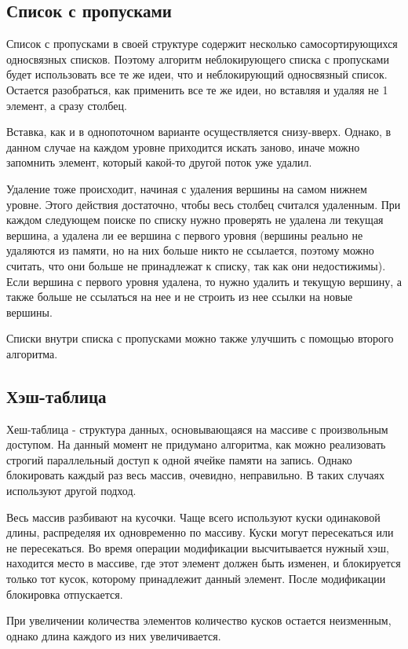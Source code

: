 \documentclass[12pt]{article}
\begin{document}
{			\subsection{Список с пропусками}
				\par Список с пропусками в своей структуре содержит несколько самосортирующихся односвязных списков. Поэтому алгоритм неблокирующего списка с пропусками будет использовать все те же идеи, что и неблокирующий односвязный список. Остается разобраться, как применить все те же идеи, но вставляя и удаляя не 1 элемент, а сразу столбец. 
				\par Вставка, как и в однопоточном варианте осуществляется снизу-вверх. Однако, в данном случае на каждом уровне приходится искать заново, иначе можно запомнить элемент, который какой-то другой поток уже удалил.
				\par Удаление тоже происходит, начиная с удаления вершины на самом нижнем уровне. Этого действия достаточно, чтобы весь столбец считался удаленным. При каждом следующем поиске по списку нужно проверять не удалена ли текущая вершина, а удалена ли ее вершина с первого уровня (вершины реально не удаляются из памяти, но на них больше никто не ссылается, поэтому можно считать, что они больше не принадлежат к списку, так как они недостижимы). Если вершина с первого уровня удалена, то нужно удалить и текущую вершину, а также больше не ссылаться на нее и не строить из нее ссылки на новые вершины.
				\par Списки внутри списка с пропусками можно также улучшить с помощью второго алгоритма.
			\subsection{Хэш-таблица}
				\par Хеш-таблица - структура данных, основывающаяся на массиве с произвольным доступом. На данный момент не придумано алгоритма, как можно реализовать строгий параллельный доступ к одной ячейке памяти на запись. Однако блокировать каждый раз весь массив, очевидно, неправильно. В таких случаях используют другой подход.
				\par Весь массив разбивают на кусочки. Чаще всего используют куски одинаковой длины, распределяя их одновременно по массиву. Куски могут пересекаться или не пересекаться. Во время операции модификации высчитывается нужный хэш, находится место в массиве, где этот элемент должен быть изменен, и блокируется только тот кусок, которому принадлежит данный элемент. После модификации блокировка отпускается.
				\par При увеличении количества элементов количество кусков остается неизменным, однако длина каждого из них увеличивается.
				
}
\end{document}
